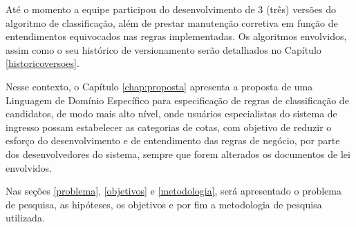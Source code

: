 Até o momento a equipe participou do desenvolvimento de 3 (três) versões do algoritmo de classificação, além de prestar manutenção corretiva em função de entendimentos equivocados nas regras implementadas.  Os algoritmos envolvidos, assim como o seu histórico de versionamento serão detalhados no Capítulo \ref{historicoversoes}.

Nesse contexto, o Capítulo \ref{chap:proposta} apresenta a proposta de uma Linguagem de Domínio Específico para especificação de regras de classificação de candidatos, de modo mais alto nível, onde usuários especialistas do sistema de ingresso possam estabelecer as categorias de cotas, com objetivo de reduzir o esforço do desenvolvimento e de entendimento das regras de negócio, por parte dos desenvolvedores do sistema, sempre que forem alterados os documentos de lei envolvidos.

Nas seções \ref{problema}, \ref{objetivos}  e \ref{metodologia}, será apresentado o problema de pesquisa, as hipóteses, os objetivos e por fim a metodologia de pesquisa utilizada.
